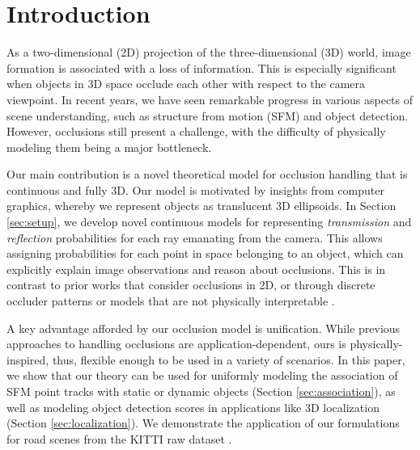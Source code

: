 \section{Introduction}


As a two-dimensional (2D) projection of the three-dimensional (3D) world, image formation is associated with a loss of information. This is especially significant when objects in 3D space occlude each other with respect to the camera viewpoint. In recent years, we have seen remarkable progress in various aspects of scene understanding, such as structure from motion (SFM) and object detection. However, occlusions still present a challenge, with the difficulty of physically modeling them being a major bottleneck. 

Our main contribution is a novel theoretical model for occlusion handling that is continuous and fully 3D. Our model is motivated by insights from computer graphics, whereby we represent objects as translucent 3D ellipsoids. In Section \ref{sec:setup}, we develop novel continuous models for representing \emph{transmission} and \emph{reflection} probabilities for each ray emanating from the camera. This allows assigning probabilities for each point in space belonging to an object, which can explicitly explain image observations and reason about occlusions. This is in contrast to prior works that consider occlusions in 2D, or through discrete occluder patterns or models that are not physically interpretable \cite{Pepik_etal_2012,Pepik_etal_2013,Xiang_Savarese_2013,Zia_etal_2013,Zia_etal_2014,Zia2015}.

A key advantage afforded by our occlusion model is unification. While previous approaches to handling occlusions are application-dependent, ours is physically-inspired, thus, flexible enough to be used in a variety of scenarios. In this paper, we show that our theory can be used for uniformly modeling the association of SFM point tracks with static or dynamic objects (Section \ref{sec:association}), as well as modeling object detection scores in applications like 3D localization (Section \ref{sec:localization}). We demonstrate the application of our formulations for road scenes from the KITTI raw dataset \cite{Geiger_etal_2012}.

